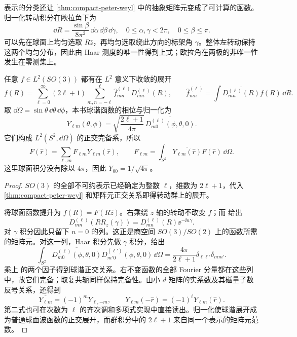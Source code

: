 表示的分类还让 \cref{thm:compact-peter-weyl} 中的抽象矩阵元变成了可计算的函数。归一化转动积分在欧拉角下为
\[
\dd R=\frac{\sin\beta}{8\pi^2}\,\dd\alpha\,\dd\beta\,\dd\gamma,
\quad 0\le\alpha,\gamma<2\pi,\quad0\le\beta\le\pi.
\]
可以先在球面上均匀选取 $R\hat z$，再均匀选取绕此方向的标架角 $\gamma$。整体左转动保持这两个均匀分布，因此由 Haar 测度的唯一性得到上式；欧拉角在两极的非唯一性发生在零测集上。

\begin{proposition}[$SO(3)$ 展开与球谐展开]
任意 $f\in L^2(SO(3))$ 都有在 $L^2$ 意义下收敛的展开
\[
f(R)=\sum_{\ell=0}^{\infty}(2\ell+1)
\sum_{m,n=-\ell}^{\ell}\widehat f^{(\ell)}_{mn}D^{(\ell)}_{mn}(R),
\qquad
\widehat f^{(\ell)}_{mn}=\int\overline{D^{(\ell)}_{mn}(R)}f(R)\,\dd R.
\]
取 \(\dd\Omega=\sin\theta\,\dd\theta\,\dd\phi\)，本书球谐函数的相位与归一化为
\begin{equation}
Y_{\ell m}(\theta,\phi)
=\sqrt{\frac{2\ell+1}{4\pi}}\,
\overline{D^{(\ell)}_{m0}(\phi,\theta,0)}.
\label{eq:spherical-harmonic-D-normalization}
\end{equation}
它们构成 $L^2(S^2,\dd\Omega)$ 的正交完备系，所以
\[
F(\hat r)=\sum_{\ell,m}F_{\ell m}Y_{\ell m}(\hat r),\qquad
F_{\ell m}=\int_{S^2}\overline{Y_{\ell m}(\hat r)}F(\hat r)\,\dd\Omega.
\]
这里球面积分没有除以 $4\pi$，因此 $Y_{00}=1/\sqrt{4\pi}$。
\label{prop:so3-spherical-peter-weyl}
\end{proposition}

\begin{proof}
$SO(3)$ 的全部不可约表示已经确定为整数 $\ell$，维数为 $2\ell+1$，代入 \cref{thm:compact-peter-weyl} 和矩阵元正交关系即得转动群上的展开。

将球面函数提升为 $f(R)=F(R\hat z)$。右乘绕 $z$ 轴的转动不改变 $f$；而  给出
\[
D^{(\ell)}_{mn}(RR_z(\gamma))
=D^{(\ell)}_{mn}(R)\ee^{-\ii n\gamma}.
\]
对 $\gamma$ 积分因此只留下 $n=0$ 的列。这正是商空间 $SO(3)/SO(2)$ 上的函数所需的矩阵元。对这一列，Haar 积分先做 $\gamma$ 积分，给出
\[
\int_{S^2}\overline{D^{(\ell)}_{m0}(\phi,\theta,0)}
D^{(\ell')}_{m'0}(\phi,\theta,0)\,\dd\Omega
=\frac{4\pi}{2\ell+1}\delta_{\ell\ell'}\delta_{mm'}.
\]
乘上  的两个因子得到球谐正交关系。右不变函数的全部 Fourier 分量都在这些列中，故它们完备；取复共轭同样保持完备性。由小 $d$ 矩阵的实系数及其磁量子数反号关系，还得到
\[
\overline{Y_{\ell m}}=(-1)^mY_{\ell,-m},\qquad
Y_{\ell m}(-\hat r)=(-1)^\ell Y_{\ell m}(\hat r).
\]
第二式也可在次数为 $\ell$ 的齐次调和多项式实现中直接读出。归一化使球谐展开成为普通球面波函数的正交展开，而群积分中的 $2\ell+1$ 来自同一个表示的矩阵元范数。
\end{proof}

